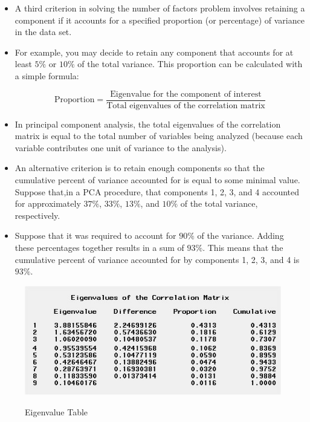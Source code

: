 \documentclass[a4paper,12pt]{article}
\begin{document}
\begin{itemize}
	\item A third criterion in solving the number of factors
	problem involves retaining a component if it accounts for a specified proportion (or percentage)
	of variance in the data set. 
	\item For example, you may decide to retain any component that accounts
	for at least $5\%$ or $10\%$ of the total variance.  This proportion can be calculated with a simple
	formula:
	
	\[ \mbox{Proportion}  = \frac{\mbox{Eigenvalue for the component of interest}}{\mbox{Total eigenvalues of the correlation matrix}}  \]
	
	\item 	In principal component analysis, the total eigenvalues of the correlation matrix is equal to the
	total number of variables being analyzed (because each variable contributes one unit of variance
	to the analysis).
	
	\item 	An alternative criterion is to retain enough components so that the cumulative percent of variance
	accounted for is equal to some minimal value.  Suppose that,in a PCA procedure, that components 1, 2, 3,
	and 4 accounted for approximately $37\%$, $33\%$, $13\%$, and $10\%$ of the total variance, respectively.
	
	\item 	Suppose that it was required to account for $90\%$ of the variance. Adding these percentages together results in a sum of $93\%$.  This means that the cumulative percent of variance accounted for by components 1, 2, 3, and 4 is $93\%$.
\end{itemize}


\begin{figure}[h!]
	\begin{center}
		\includegraphics[scale=0.9]{3AEigen.jpg}\\
		\caption{Eigenvalue Table}\label{Eigenvalue Table}
	\end{center}
	
\end{figure}
\end{document}
